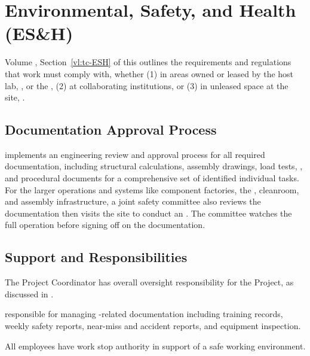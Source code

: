 \section{Environmental, Safety, and Health (ES\&H)}
\label{sec:fdsp-tc-safety}

 Volume \volnumbertc{}, Section~\ref{vl:tc-ESH} of this  outlines the requirements and regulations that  work must comply with, whether (1) in areas  owned or leased by the host lab, , or the , (2) at collaborating institutions, or (3)  in unleased space at the  site, . 

\subsection{Documentation Approval Process}

 implements an engineering review and approval process for all required documentation, including structural calculations, assembly drawings, load tests, , and procedural documents for a comprehensive set of identified individual tasks.  For the larger operations and systems like  component factories, the , cleanroom, and assembly infrastructure, a joint safety committee also reviews the documentation then visits the site to conduct
 an . The committee watches the full operation before signing off on the documentation.
 
\subsection{ Support and Responsibilities}

The  Project  Coordinator has overall  oversight responsibility for the  Project, as discussed in \volnumbertc{} . 

 responsible for managing -related  documentation including training records, weekly safety reports, near-miss and accident reports, and equipment inspection.

All employees have work stop authority in support of  a safe working environment. 


